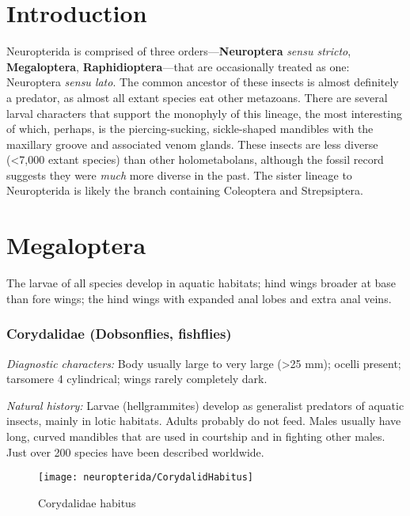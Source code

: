 \section*{Introduction}
Neuropterida is comprised of three orders---\textbf{Neuroptera} \textit{sensu stricto}, \textbf{Megaloptera}, \textbf{Raphidioptera}---that are occasionally treated as one: Neuroptera \textit{sensu lato}. The common ancestor of these insects is almost definitely a predator, as almost all extant species eat other metazoans. There are several larval characters that support the monophyly of this lineage, the most interesting of which, perhaps, is the piercing-sucking, sickle-shaped mandibles with the maxillary groove and associated venom glands. These insects are less diverse (\textless7,000 extant species) than other holometabolans, although the fossil record suggests they were \textit{much} more diverse in the past. The sister lineage to Neuropterida is likely the branch containing Coleoptera and Strepsiptera.

\section{Megaloptera}
The larvae of all species develop in aquatic habitats;
 hind wings broader at base than fore wings; the hind wings with expanded anal lobes and extra anal veins.\vspace{3mm}

\subsubsection{Corydalidae (Dobsonflies, fishflies)}

\noindent{}\textit{Diagnostic characters:} Body usually large to very large (\textgreater25 mm); ocelli present; tarsomere 4 cylindrical; wings rarely completely dark.\vspace{3mm}

\noindent{}\textit{Natural history:} Larvae (hellgrammites) develop as generalist predators of aquatic insects, mainly in lotic habitats. Adults probably do not feed. Males usually have long, curved mandibles that are used in courtship and in fighting other males. Just over 200 species have been described worldwide.\vspace{3mm}

\begin{figure}[ht!]
  \centering
    \texttt{[image: neuropterida/CorydalidHabitus]}
\caption{Corydalidae habitus \citep[modified from][Fig. 56c,d]{walsh2004hellgrammite}}
  \label{fig:corydalid}
\end{figure}

